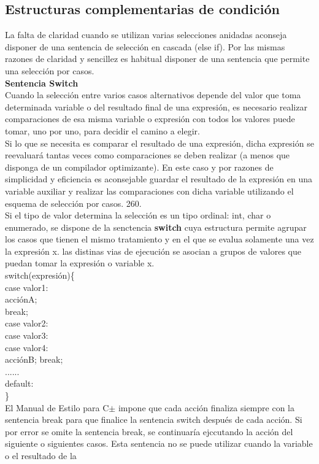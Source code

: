 \documentclass[11pt,a4paper]{article}
\begin{document}
  \subsection{Estructuras complementarias de condición}
  La falta de claridad cuando se utilizan varias selecciones anidadas aconseja disponer de una sentencia de selección en cascada (else if). Por las mismas razones de claridad y sencillez es habitual disponer de una
  sentencia que permite una selección por casos.\\
  \textbf{Sentencia Switch}
  \\
  Cuando la selección entre varios casos alternativos depende del valor que toma
  determinada variable o del resultado final de una expresión, es necesario
  realizar comparaciones de esa misma variable o expresión con todos los valores
  puede tomar, uno por uno, para decidir el camino a elegir.\\
  Si lo que se necesita es comparar el resultado de una expresión, dicha expresión se reevaluará tantas veces como comparaciones se deben realizar (a menos que disponga de un compilador optimizante). En este caso y por razones de simplicidad y eficiencia es aconsejable guardar el resultado de la expresión en una variable auxiliar y realizar las comparaciones con dicha variable utilizando el esquema de selección por casos. 260.\\
  Si el tipo de valor determina la selección es un tipo ordinal: int, char o enumerado, se dispone de la senctencia \textbf{switch} cuya estructura permite agrupar los casos que tienen el mismo tratamiento y en el que se evalua solamente una vez la expresión x. las distinas vias de ejecución se asocian a grupos de valores que puedan tomar la expresión o variable x.\\
  switch(expresión)\{\\
  case valor1:\\
  acciónA;\\
  break;\\
  case valor2:\\
  case valor3:\\
  case valor4:\\
  acciónB;
  break;\\
  ......\\
  default:\\
  \} \\
  El Manual de Estilo para C$\pm$ impone que cada acción finaliza siempre con la
  sentencia break para que finalice la sentencia switch después de cada acción.
  Si por error se omite la sentencia break, se continuaría ejccutando la acción del siguiente o siguientes casos. Esta sentencia no se puede utilizar cuando la variable o el resultado de la
\end{document}
